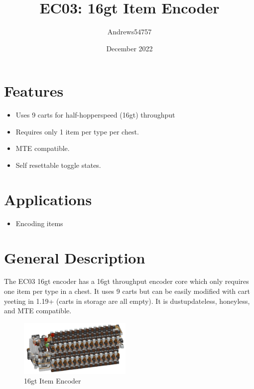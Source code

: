 \documentclass[10pt]{datasheet}
\title{EC03: 16gt Item Encoder}
\author{Andrews54757}
\date{December 2022}
\begin{document}
\maketitle

\section{Features}

\begin{itemize}
\item{Uses 9 carts for half-hopperspeed (16gt) throughput}
\item{Requires only 1 item per type per chest.}
\item{MTE compatible.}
\item{Self resettable toggle states.}
\end{itemize}

\section{Applications}

\begin{itemize}
\item{Encoding items}
\end{itemize}

\section{General Description}
The EC03 16gt encoder has a 16gt throughput encoder core which only requires one item per type in a chest. It uses 9 carts but can be easily modified with cart yeeting in 1.19+ (carts in storage are all empty). It is dustupdateless, honeyless, and MTE compatible.
\vfill\break

\begin{figure}[h]
    \centering
    \includegraphics[width=0.48\textwidth]{coder.png}
    \caption{\centering 16gt Item Encoder}
\end{figure}

\onecolumn
\end{document}
